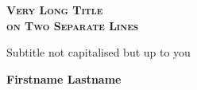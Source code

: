 \documentclass[../main_brownies.tex]{subfiles}
\begin{document}
\sffamily

\begin{titlepage}
	\begin{center}
		\vspace*{1cm}
		
		\huge
		\textsc{\bfseries{Very Long Title\\on Two Separate Lines}}
		
		\vspace{0.5cm}
		\Large
		Subtitle not capitalised but up to you
		
		
		\vfill
		
		\textbf{Firstname Lastname}
		
		\vspace{0.5 cm}

	\end{center}
\end{titlepage}
\end{document}
